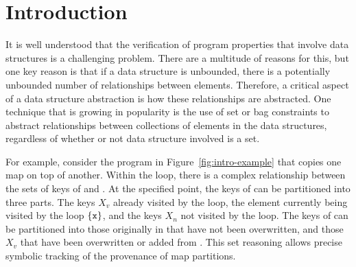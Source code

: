 \section{Introduction}
\label{s:1:intro}


It is well understood that the verification of program properties that
involve data structures is a challenging problem.
There are a multitude of reasons for this, but one key reason is that
if a data structure is unbounded, there is a potentially unbounded number
of relationships between elements.
Therefore, a critical aspect of a data structure abstraction is how these
relationships are abstracted.
One technique that is growing in popularity is the use of set or bag
constraints to abstract relationships between collections of elements
in the data structures, regardless of whether or not data structure
involved is a set.

For example, consider the program in Figure~\ref{fig:intro-example}
that copies one map on top of another.
Within the loop, there is a complex relationship between the sets of
keys of  and .
At the specified point, the keys of  can be partitioned into
three parts.
The keys $X_v$ already visited by the loop, the element currently being
visited by the loop $\{\texttt{x}\}$, and the keys $X_n$ not visited by
the loop.
The keys of  can be partitioned into those originally in
 that have not been overwritten, and those $X_v$ that have
been overwritten or added from .
This set reasoning allows precise symbolic tracking of the provenance
of map partitions.

